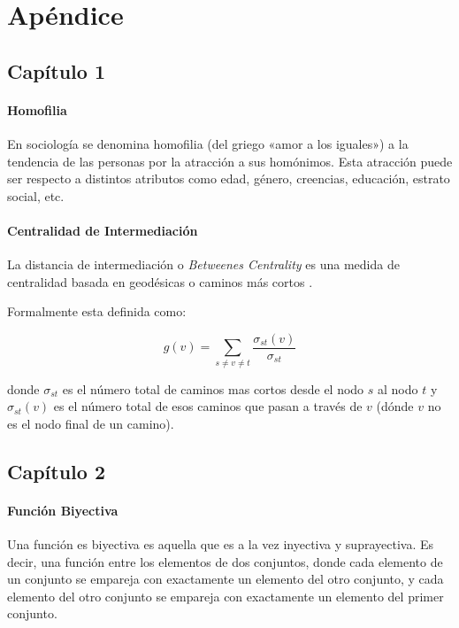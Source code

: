 
\chapter{Apéndice}
\label{sec:appendix}

\section{Capítulo 1}
\label{sec:appendix:c2}

\subsubsection{Homofilia}

En sociología se denomina homofilia (del griego «amor a los iguales») a la tendencia de las personas por la atracción a sus homónimos. Esta atracción puede ser respecto a distintos atributos como edad, género, creencias, educación, estrato social, etc.

\subsubsection{Centralidad de Intermediación}

La distancia de intermediación o \textit{Betweenes Centrality} es una medida de centralidad basada en geodésicas o caminos más cortos \cite{wikipedia_betweenness_nodate}.

Formalmente esta definida como:

$$g(v)=\sum _{{s\neq v\neq t}}{\frac  {\sigma _{{st}}(v)}{\sigma _{{st}}}}$$

donde $\sigma_{st}$ es el número total de caminos mas cortos desde el nodo $s$ al nodo $t$ y $\sigma_{st}(v)$ es el número total de esos caminos que pasan a través de $v$ (dónde $v$ no es el nodo final de un camino).

\section{Capítulo 2}
\label{sec:appendix:c2}

\subsubsection{Función Biyectiva}

Una función es biyectiva es aquella que es a la vez inyectiva y suprayectiva. Es decir, una función entre los elementos de dos conjuntos, donde cada elemento de un conjunto se empareja con exactamente un elemento del otro conjunto, y cada elemento del otro conjunto se empareja con exactamente un elemento del primer conjunto.

